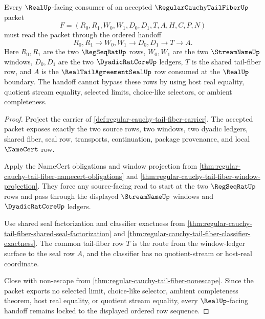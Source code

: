 \begin{theorem}
\label{thm:regular-cauchy-tail-fiber-regseq-real-handoff-lock}
Every $\RealUp$-facing consumer of an accepted $\RegularCauchyTailFiberUp$ packet
$$
F=(R_0,R_1,W_0,W_1,D_0,D_1,T,A,H,C,P,N)
$$
must read the packet through the ordered handoff
$$
R_0,R_1 \longrightarrow W_0,W_1 \longrightarrow D_0,D_1 \longrightarrow T \longrightarrow A.
$$
Here $R_0,R_1$ are the two $\RegSeqRatUp$ rows, $W_0,W_1$ are the two $\StreamNameUp$ windows, $D_0,D_1$ are the two $\DyadicRatCoreUp$ ledgers, $T$ is the shared tail-fiber row, and $A$ is the $\RealTailAgreementSealUp$ row consumed at the $\RealUp$ boundary. The handoff cannot bypass these rows by using host real equality, quotient stream equality, selected limits, choice-like selectors, or ambient completeness.
\end{theorem}
\begin{proof}
Project the carrier of \autoref{def:regular-cauchy-tail-fiber-carrier}. The accepted packet exposes exactly the two source rows, two windows, two dyadic ledgers, shared fiber, seal row, transports, continuation, package provenance, and local $\NameCert$ row.

Apply the NameCert obligations and window projection from \autoref{thm:regular-cauchy-tail-fiber-namecert-obligations} and \autoref{thm:regular-cauchy-tail-fiber-window-projection}. They force any source-facing read to start at the two $\RegSeqRatUp$ rows and pass through the displayed $\StreamNameUp$ windows and $\DyadicRatCoreUp$ ledgers.

Use shared seal factorization and classifier exactness from \autoref{thm:regular-cauchy-tail-fiber-shared-seal-factorization} and \autoref{thm:regular-cauchy-tail-fiber-classifier-exactness}. The common tail-fiber row $T$ is the route from the window-ledger surface to the seal row $A$, and the classifier has no quotient-stream or host-real coordinate.

Close with non-escape from \autoref{thm:regular-cauchy-tail-fiber-nonescape}. Since the packet exports no selected limit, choice-like selector, ambient completeness theorem, host real equality, or quotient stream equality, every $\RealUp$-facing handoff remains locked to the displayed ordered row sequence.
\end{proof}

